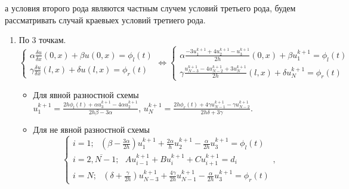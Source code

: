\documentclass[12pt]{article}
\begin{document}
    а условия второго рода являются частным случем условий третьего рода, будем рассматривать случай краевыех условий третиего рода.
    \begin{enumerate}
        \item По 3 точкам.
        \begin{equation*}
            \begin{cases}
                \alpha\frac{\delta u}{\delta x}(0,x) + \beta u(0,x)= \phi_l(t)
                \\
                \gamma\frac{\delta u}{\delta x}(l,x) + \delta u(l,x)= \phi_r(t)
            \end{cases}
            \Leftrightarrow
            \begin{cases}
                \alpha\frac{-3u_1^{k+1}+4u_{2}^{k+1}-u_{3}^{k+1}}{2h}(0,x) + \beta u_{1}^{k+1} = \phi_l(t)
                \\
                \gamma\frac{u_{N-3}^{k+1}-4u_{N-2}^{k+1}+3u_N^{k+1}}{2h}(l,x) + \delta u_{N}^{k+1}= \phi_r(t)
            \end{cases}
        \end{equation*}
        \begin{itemize}
            \item Для явной разностной схемы\\
                $u_1^{k+1}=\frac{2h\phi_l(t)+\alpha u_3^{k+1}-4\alpha u_2^{k+1}}{2h\beta-3\alpha}$, 
                $u_N^{k+1}=\frac{2h\phi_r(t)+4\gamma u_{N-1}^{k+1}-\gamma u_{N-2}^{k+1}}{2h\delta+3\gamma}$.
            
            \item  Для не явной разностной схемы\\
                \begin{equation*}
                    \begin{cases}
                        i=1;\:\:\: \left(\beta-\frac{3\alpha}{2h}\right)u_1^{k+1}+ \frac{2\alpha}{h}u_2^{k+1} -\frac{\alpha}{2h}u_{3}^{k+1}=\phi_l(t)
                        \\
                        i=\overline{2,N-1};\:\:\:Au_{i-1}^{k+1} + Bu_i^{k+1} +Cu_{i+1}^{k+1}=d_i
                        \\
                        i=N;\:\:\: \left(\delta+\frac{\gamma}{2h}\right)u_{N-3}^{k+1}+\frac{4\gamma}{2h}u_{N-1}^{k+1} - \frac{\alpha}{2h}u_{3}^{k+1} =\phi_r(t)
                    \end{cases},
                \end{equation*}
        \end{itemize}


\end{enumerate}
\end{document}
